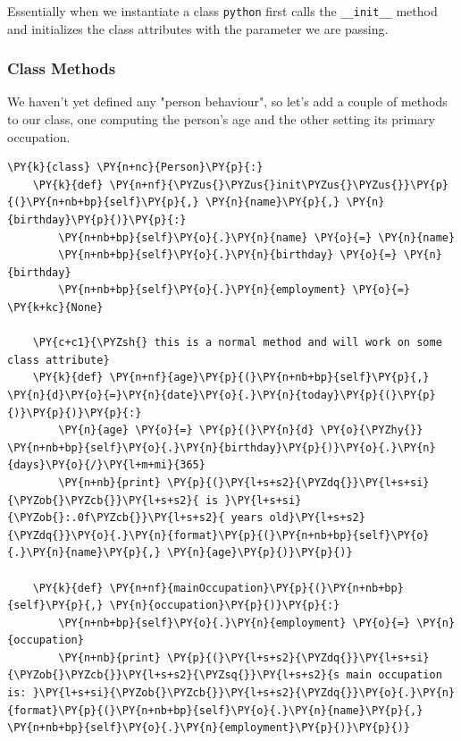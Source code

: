 Essentially when we instantiate a class \texttt{python} first calls the
\texttt{\_\_init\_\_} method and initializes the class attributes with
the parameter we are passing.

\subsubsection{Class Methods}

We haven't yet defined any "person behaviour", so let's add a couple
of methods to our class, one computing the person's age and the other
setting its primary occupation.

\begin{tcolorbox}[breakable, size=fbox, boxrule=1pt, pad at break*=1mm,colback=cellbackground, colframe=cellborder]
\begin{Verbatim}[commandchars=\\\{\}]
\PY{k}{class} \PY{n+nc}{Person}\PY{p}{:}
    \PY{k}{def} \PY{n+nf}{\PYZus{}\PYZus{}init\PYZus{}\PYZus{}}\PY{p}{(}\PY{n+nb+bp}{self}\PY{p}{,} \PY{n}{name}\PY{p}{,} \PY{n}{birthday}\PY{p}{)}\PY{p}{:}
        \PY{n+nb+bp}{self}\PY{o}{.}\PY{n}{name} \PY{o}{=} \PY{n}{name}
        \PY{n+nb+bp}{self}\PY{o}{.}\PY{n}{birthday} \PY{o}{=} \PY{n}{birthday}     
        \PY{n+nb+bp}{self}\PY{o}{.}\PY{n}{employment} \PY{o}{=} \PY{k+kc}{None}
                
    \PY{c+c1}{\PYZsh{} this is a normal method and will work on some class attribute}
    \PY{k}{def} \PY{n+nf}{age}\PY{p}{(}\PY{n+nb+bp}{self}\PY{p}{,} \PY{n}{d}\PY{o}{=}\PY{n}{date}\PY{o}{.}\PY{n}{today}\PY{p}{(}\PY{p}{)}\PY{p}{)}\PY{p}{:}
        \PY{n}{age} \PY{o}{=} \PY{p}{(}\PY{n}{d} \PY{o}{\PYZhy{}} \PY{n+nb+bp}{self}\PY{o}{.}\PY{n}{birthday}\PY{p}{)}\PY{o}{.}\PY{n}{days}\PY{o}{/}\PY{l+m+mi}{365}
        \PY{n+nb}{print} \PY{p}{(}\PY{l+s+s2}{\PYZdq{}}\PY{l+s+si}{\PYZob{}\PYZcb{}}\PY{l+s+s2}{ is }\PY{l+s+si}{\PYZob{}:.0f\PYZcb{}}\PY{l+s+s2}{ years old}\PY{l+s+s2}{\PYZdq{}}\PY{o}{.}\PY{n}{format}\PY{p}{(}\PY{n+nb+bp}{self}\PY{o}{.}\PY{n}{name}\PY{p}{,} \PY{n}{age}\PY{p}{)}\PY{p}{)}
        
    \PY{k}{def} \PY{n+nf}{mainOccupation}\PY{p}{(}\PY{n+nb+bp}{self}\PY{p}{,} \PY{n}{occupation}\PY{p}{)}\PY{p}{:}
        \PY{n+nb+bp}{self}\PY{o}{.}\PY{n}{employment} \PY{o}{=} \PY{n}{occupation}
        \PY{n+nb}{print} \PY{p}{(}\PY{l+s+s2}{\PYZdq{}}\PY{l+s+si}{\PYZob{}\PYZcb{}}\PY{l+s+s2}{\PYZsq{}}\PY{l+s+s2}{s main occupation is: }\PY{l+s+si}{\PYZob{}\PYZcb{}}\PY{l+s+s2}{\PYZdq{}}\PY{o}{.}\PY{n}{format}\PY{p}{(}\PY{n+nb+bp}{self}\PY{o}{.}\PY{n}{name}\PY{p}{,} \PY{n+nb+bp}{self}\PY{o}{.}\PY{n}{employment}\PY{p}{)}\PY{p}{)}
\end{Verbatim}
\end{tcolorbox}

